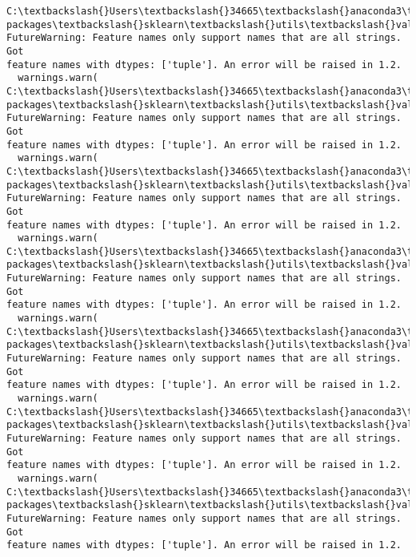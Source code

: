 \documentclass[11pt]{article}
\begin{document}
    \begin{Verbatim}[commandchars=\\\{\}]
C:\textbackslash{}Users\textbackslash{}34665\textbackslash{}anaconda3\textbackslash{}lib\textbackslash{}site-packages\textbackslash{}sklearn\textbackslash{}utils\textbackslash{}validation.py:1688:
FutureWarning: Feature names only support names that are all strings. Got
feature names with dtypes: ['tuple']. An error will be raised in 1.2.
  warnings.warn(
C:\textbackslash{}Users\textbackslash{}34665\textbackslash{}anaconda3\textbackslash{}lib\textbackslash{}site-packages\textbackslash{}sklearn\textbackslash{}utils\textbackslash{}validation.py:1688:
FutureWarning: Feature names only support names that are all strings. Got
feature names with dtypes: ['tuple']. An error will be raised in 1.2.
  warnings.warn(
C:\textbackslash{}Users\textbackslash{}34665\textbackslash{}anaconda3\textbackslash{}lib\textbackslash{}site-packages\textbackslash{}sklearn\textbackslash{}utils\textbackslash{}validation.py:1688:
FutureWarning: Feature names only support names that are all strings. Got
feature names with dtypes: ['tuple']. An error will be raised in 1.2.
  warnings.warn(
C:\textbackslash{}Users\textbackslash{}34665\textbackslash{}anaconda3\textbackslash{}lib\textbackslash{}site-packages\textbackslash{}sklearn\textbackslash{}utils\textbackslash{}validation.py:1688:
FutureWarning: Feature names only support names that are all strings. Got
feature names with dtypes: ['tuple']. An error will be raised in 1.2.
  warnings.warn(
C:\textbackslash{}Users\textbackslash{}34665\textbackslash{}anaconda3\textbackslash{}lib\textbackslash{}site-packages\textbackslash{}sklearn\textbackslash{}utils\textbackslash{}validation.py:1688:
FutureWarning: Feature names only support names that are all strings. Got
feature names with dtypes: ['tuple']. An error will be raised in 1.2.
  warnings.warn(
C:\textbackslash{}Users\textbackslash{}34665\textbackslash{}anaconda3\textbackslash{}lib\textbackslash{}site-packages\textbackslash{}sklearn\textbackslash{}utils\textbackslash{}validation.py:1688:
FutureWarning: Feature names only support names that are all strings. Got
feature names with dtypes: ['tuple']. An error will be raised in 1.2.
  warnings.warn(
C:\textbackslash{}Users\textbackslash{}34665\textbackslash{}anaconda3\textbackslash{}lib\textbackslash{}site-packages\textbackslash{}sklearn\textbackslash{}utils\textbackslash{}validation.py:1688:
FutureWarning: Feature names only support names that are all strings. Got
feature names with dtypes: ['tuple']. An error will be raised in 1.2.

\end{Verbatim}
\end{document}
